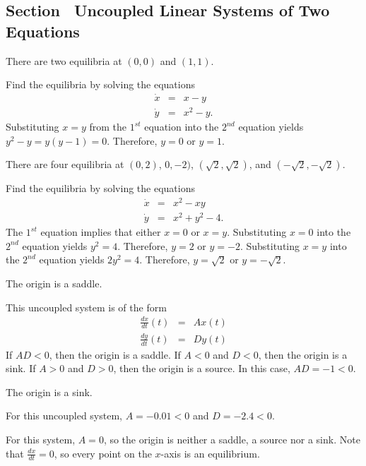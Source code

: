 \documentclass{ximera}
\begin{document}
\subsection*{Section~\protect{\ref{sec:UncoupledLS}} Uncoupled Linear
Systems of Two Equations}

 \ans There are two equilibria at $(0,0)$ and $(1,1)$.

\soln Find the equilibria by solving the equations
\begin{eqnarray*}
\dot{x} & = & x-y\\
\dot{y} & = & x^2-y.
\end{eqnarray*}
Substituting $x=y$ from the $1^{st}$ equation into the $2^{nd}$ equation
yields $y^2-y = y(y-1)=0$.  Therefore, $y=0$ or $y=1$.



 \ans There are four equilibria at $(0,2)$, $0,-2)$, 
$(\sqrt{2},\sqrt{2})$, and $(-\sqrt{2},-\sqrt{2})$.

\soln Find the equilibria by solving the equations
\begin{eqnarray*}
\dot{x} & = & x^2-xy\\
\dot{y} & = & x^2+y^2-4.
\end{eqnarray*}
The $1^{st}$ equation implies that either $x=0$ or $x=y$.  Substituting
$x=0$ into the $2^{nd}$ equation yields $y^2=4$.  Therefore, $y=2$ or $y=-2$.
Substituting $x=y$ into the $2^{nd}$ equation yields $2y^2=4$. Therefore, 
$y = \sqrt{2}$ or $y = -\sqrt{2}$.


\ans The origin is a saddle.

\soln This uncoupled system is of the form
\[
\begin{array}{rcl}
\frac{dx}{dt}(t) & = & Ax(t) \\
\frac{dy}{dt}(t) & = & Dy(t)\end{array}
\]
If $AD < 0$, then the origin is a saddle.  If $A < 0$ and
$D < 0$, then the origin is a sink.  If $A > 0$ and $D > 0$, then
the origin is a source.  In this case, $AD = -1 < 0$.

\ans The origin is a sink.

\soln For this uncoupled system, $A = -0.01 < 0$ and $D = -2.4 < 0$.

 For this system, $A = 0$, so the origin is neither a
saddle, a source nor a sink.  Note that $\frac{dx}{dt} = 0$, so every
point on the $x$-axis is an equilibrium.
\end{document}
